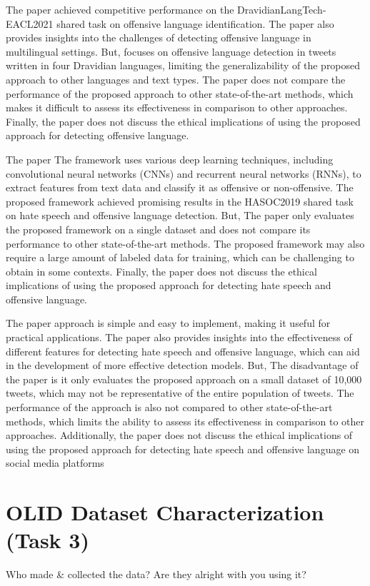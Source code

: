 \documentclass[11pt,a4paper]{article}
\begin{document}
The paper \cite{8} achieved competitive performance on the DravidianLangTech-EACL2021 shared task on offensive language identification. The paper also provides insights into the challenges of detecting offensive language in multilingual settings. But, focuses on offensive language detection in tweets written in four Dravidian languages, limiting the generalizability of the proposed approach to other languages and text types. The paper does not compare the performance of the proposed approach to other state-of-the-art methods, which makes it difficult to assess its effectiveness in comparison to other approaches. Finally, the paper does not discuss the ethical implications of using the proposed approach for detecting offensive language.

The paper \cite{9} The framework uses various deep learning techniques, including convolutional neural networks (CNNs) and recurrent neural networks (RNNs), to extract features from text data and classify it as offensive or non-offensive. The proposed framework achieved promising results in the HASOC2019 shared task on hate speech and offensive language detection. But, The paper only evaluates the proposed framework on a single dataset and does not compare its performance to other state-of-the-art methods. The proposed framework may also require a large amount of labeled data for training, which can be challenging to obtain in some contexts. Finally, the paper does not discuss the ethical implications of using the proposed approach for detecting hate speech and offensive language.

The paper\cite{10} approach is simple and easy to implement, making it useful for practical applications. The paper also provides insights into the effectiveness of different features for detecting hate speech and offensive language, which can aid in the development of more effective detection models. But, The disadvantage of the paper is it only evaluates the proposed approach on a small dataset of 10,000 tweets, which may not be representative of the entire population of tweets. The performance of the approach is also not compared to other state-of-the-art methods, which limits the ability to assess its effectiveness in comparison to other approaches. Additionally, the paper does not discuss the ethical implications of using the proposed approach for detecting hate speech and offensive language on social media platforms

\section{OLID Dataset Characterization (Task 3)}
    Who made & collected the data? Are they alright with you using it?
\end{document}

